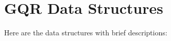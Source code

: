 \section{GQR Data Structures}
Here are the data structures with brief descriptions:\begin{CompactList}
\item{}
\end{CompactList}

